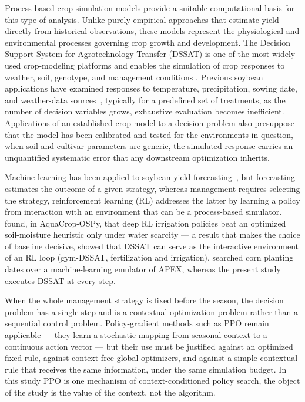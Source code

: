 \documentclass[times,final,authoryear]{elsarticle}
\begin{document}
Process-based crop simulation models provide a suitable computational basis for this type of analysis. Unlike purely empirical approaches that estimate yield directly from historical observations, these models represent the physiological and environmental processes governing crop growth and development. The Decision Support System for Agrotechnology Transfer (DSSAT) is one of the most widely used crop-modeling platforms and enables the simulation of crop responses to weather, soil, genotype, and management conditions \citep{ovando2018dssatsoybean, singh2024dssatsoybean}. Previous soybean applications have examined responses to temperature, precipitation, sowing date, and weather-data sources~\citep{battisti2017soybeanmodels, battisti2018climatesensitivity, ovando2018dssatsoybean}, typically for a predefined set of treatments, as the number of decision variables grows, exhaustive evaluation becomes inefficient. Applications of an established crop model to a decision problem also presuppose that the model has been calibrated and tested for the environments in question, when soil and cultivar parameters are generic, the simulated response carries an unquantified systematic error that any downstream optimization inherits.

Machine learning has been applied to soybean yield forecasting~\citep{vonbloh2023mlsoybean, schwalbert2020soybeanforecast}, but forecasting estimates the outcome of a given strategy, whereas management requires selecting the strategy, reinforcement learning (RL) addresses the latter by learning a policy from interaction with an environment that can be a process-based simulator. \citet{kelly2024assessing} found, in AquaCrop-OSPy, that deep RL irrigation policies beat an optimized soil-moisture heuristic only under water scarcity --- a result that makes the choice of baseline decisive, \citet{balderas2025comparative} showed that DSSAT can serve as the interactive environment of an RL loop (gym-DSSAT, fertilization and irrigation), \citet{noa2026hybrid} searched corn planting dates over a machine-learning emulator of APEX, whereas the present study executes DSSAT at every step. 

When the whole management strategy is fixed before the season, the decision problem has a single step and is a contextual optimization problem rather than a sequential control problem. Policy-gradient methods such as PPO remain applicable --- they learn a stochastic mapping from seasonal context to a continuous action vector --- but their use must be justified against an optimized fixed rule, against context-free global optimizers, and against a simple contextual rule that receives the same information, under the same simulation budget. In this study PPO is one mechanism of context-conditioned policy search, the object of the study is the value of the context, not the algorithm.
\end{document}

